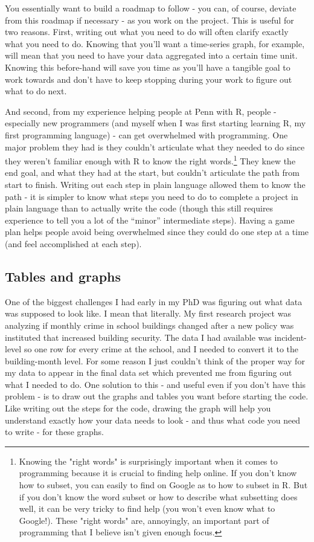 \documentclass[
]{krantz}
\begin{document}
You essentially want to build a roadmap to follow - you can,
of course, deviate from this roadmap if necessary - as you
work on the project. This is useful for two reasons. First,
writing out what you need to do will often clarify exactly
what you need to do. Knowing that you'll want a time-series
graph, for example, will mean that you need to have your
data aggregated into a certain time unit. Knowing this
before-hand will save you time as you'll have a tangible
goal to work towards and don't have to keep stopping during
your work to figure out what to do next.

And second, from my experience helping people at Penn with
R, people - especially new programmers (and myself when I
was first starting learning R, my first programming
language) - can get overwhelmed with programming. One major
problem they had is they couldn't articulate what they
needed to do since they weren't familiar enough with R to
know the right
words.\footnote{Knowing the "right words" is surprisingly important when it comes to programming because it is crucial to finding help online. If you don't know how to subset, you can easily to find on Google as to how to subset in R. But if you don't know the word subset or how to describe what subsetting does well, it can be very tricky to find help (you won't even know what to Google!). These "right words" are, annoyingly, an important part of programming that I believe isn't given enough focus.}
They knew the end goal, and what they had at the start, but
couldn't articulate the path from start to finish. Writing
out each step in plain language allowed them to know the
path - it is simpler to know what steps you need to do to
complete a project in plain language than to actually write
the code (though this still requires experience to tell you
a lot of the ``minor'' intermediate steps). Having a game
plan helps people avoid being overwhelmed since they could
do one step at a time (and feel accomplished at each step).

\hypertarget{tables-and-graphs}{%
\subsection{Tables and graphs}\label{tables-and-graphs}}

One of the biggest challenges I had early in my PhD was
figuring out what data was supposed to look like. I mean
that literally. My first research project was analyzing if
monthly crime in school buildings changed after a new policy
was instituted that increased building security. The data I
had available was incident-level so one row for every crime
at the school, and I needed to convert it to the
building-month level. For some reason I just couldn't think
of the proper way for my data to appear in the final data
set which prevented me from figuring out what I needed to
do. One solution to this - and useful even if you don't have
this problem - is to draw out the graphs and tables you want
before starting the code. Like writing out the steps for the
code, drawing the graph will help you understand exactly how
your data needs to look - and thus what code you need to
write - for these graphs.
\end{document}
